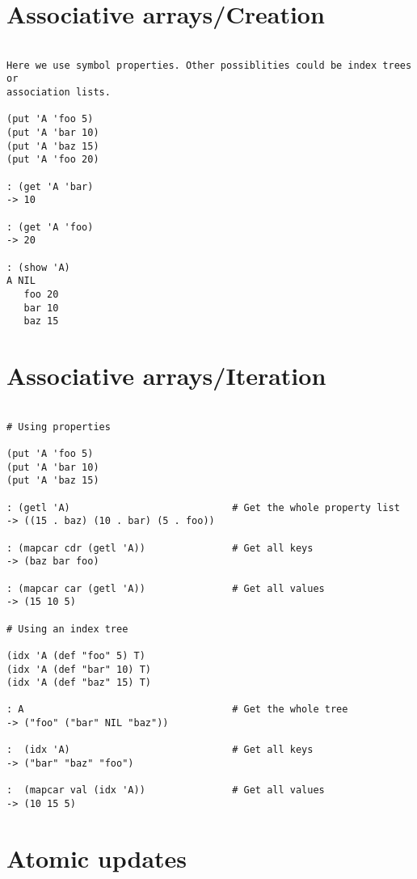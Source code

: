 \section*{Associative arrays/Creation}

\begin{verbatim}

Here we use symbol properties. Other possiblities could be index trees or
association lists.

(put 'A 'foo 5)
(put 'A 'bar 10)
(put 'A 'baz 15)
(put 'A 'foo 20)

: (get 'A 'bar)
-> 10

: (get 'A 'foo)
-> 20

: (show 'A)
A NIL
   foo 20
   bar 10
   baz 15

\end{verbatim}

\section*{Associative arrays/Iteration}

\begin{verbatim}

# Using properties

(put 'A 'foo 5)
(put 'A 'bar 10)
(put 'A 'baz 15)

: (getl 'A)                            # Get the whole property list
-> ((15 . baz) (10 . bar) (5 . foo))

: (mapcar cdr (getl 'A))               # Get all keys
-> (baz bar foo)

: (mapcar car (getl 'A))               # Get all values
-> (15 10 5)

# Using an index tree

(idx 'A (def "foo" 5) T)
(idx 'A (def "bar" 10) T)
(idx 'A (def "baz" 15) T)

: A                                    # Get the whole tree
-> ("foo" ("bar" NIL "baz"))

:  (idx 'A)                            # Get all keys
-> ("bar" "baz" "foo")

:  (mapcar val (idx 'A))               # Get all values
-> (10 15 5)

\end{verbatim}

\section*{Atomic updates}

